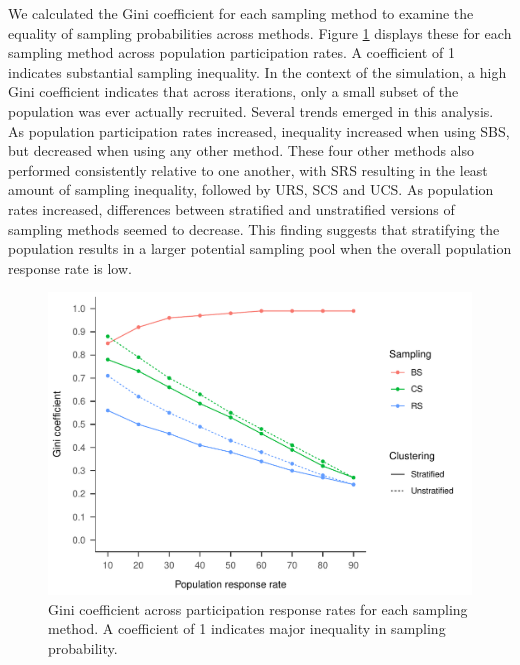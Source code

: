 \documentclass[man,floatsintext]{apa6}
\begin{document}
We calculated the Gini coefficient for each sampling method to examine the equality of sampling probabilities across methods. Figure \ref{fig:fig-gini} displays these for each sampling method across population participation rates. A coefficient of 1 indicates substantial sampling inequality. In the context of the simulation, a high Gini coefficient indicates that across iterations, only a small subset of the population was ever actually recruited.
Several trends emerged in this analysis. As population participation rates increased, inequality increased when using SBS, but decreased when using any other method. These four other methods also performed consistently relative to one another, with SRS resulting in the least amount of sampling inequality, followed by URS, SCS and UCS. As population rates increased, differences between stratified and unstratified versions of sampling methods seemed to decrease. This finding suggests that stratifying the population results in a larger potential sampling pool when the overall population response rate is low.


\begin{figure}
\centering
\includegraphics{GenSamp-Paper_files/figure-latex/fig-gini-1.pdf}
\caption{\label{fig:fig-gini}Gini coefficient across participation response rates for each sampling method. A coefficient of 1 indicates major inequality in sampling probability.}
\end{figure}
\end{document}
